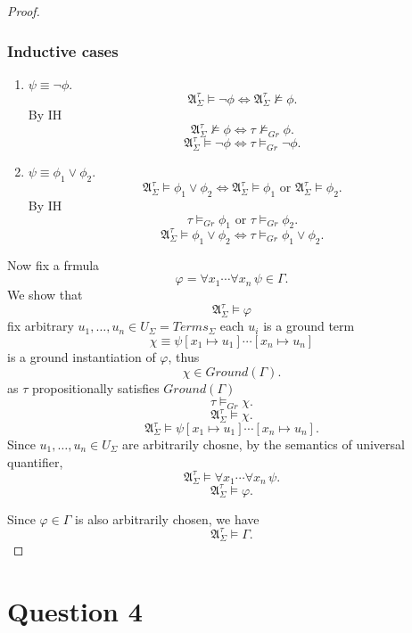 \documentclass{article}
\begin{document}
\begin{proof}
    \subsubsection*{Inductive cases}
    
    \begin{enumerate}
        \item $\psi \equiv \neg \phi$.
        \[
        \mathfrak{A}^\tau_\Sigma \models \neg\phi
        \iff
        \mathfrak{A}^\tau_\Sigma \not\models \phi.
        \]
        By IH
        \[
        \mathfrak{A}^\tau_\Sigma \not\models \phi
        \iff
        \tau \not\models_{Gr} \phi.
        \]
        \[
        \mathfrak{A}^\tau_\Sigma \models \neg\phi
        \iff
        \tau \models_{Gr} \neg\phi.
        \]
    
        \item $\psi \equiv \phi_1\lor\phi_2$.
        \[
        \mathfrak{A}^\tau_\Sigma \models \phi_1\lor\phi_2
        \iff
        \mathfrak{A}^\tau_\Sigma \models \phi_1
        \text{ or }
        \mathfrak{A}^\tau_\Sigma \models \phi_2.
        \]
        By IH
        \[
        \tau \models_{Gr} \phi_1
        \text{ or }
        \tau \models_{Gr} \phi_2.
        \]
        \[
        \mathfrak{A}^\tau_\Sigma \models \phi_1\lor\phi_2
        \iff
        \tau \models_{Gr} \phi_1\lor\phi_2.
        \]
    \end{enumerate}
    Now fix a frmula 
\[
\varphi=\forall x_1\cdots\forall x_n\,\psi \in \Gamma.
\]
We show that
\[
\mathfrak{A}^\tau_\Sigma \models \varphi
\]
fix arbitrary $u_1,\dots,u_n \in U_\Sigma = Terms_\Sigma$
each $u_i$ is a ground term
\[
\chi \equiv \psi[x_1\mapsto u_1]\cdots[x_n\mapsto u_n]
\]
is a ground instantiation of $\varphi$, thus 
\[
\chi \in Ground(\Gamma).
\]
as $\tau$ propositionally satisfies $Ground(\Gamma)$
\[
\tau \models_{Gr} \chi.
\]
\[
\mathfrak{A}^\tau_\Sigma \models \chi.
\]
\[
\mathfrak{A}^\tau_\Sigma \models \psi[x_1\mapsto u_1]\cdots[x_n\mapsto u_n].
\]
Since $u_1,\dots,u_n \in U_\Sigma$ are arbitrarily chosne, by the semantics of universal
quantifier,
\[
\mathfrak{A}^\tau_\Sigma \models \forall x_1\cdots\forall x_n\,\psi.
\]
\[
\mathfrak{A}^\tau_\Sigma \models \varphi.
\]

Since $\varphi \in \Gamma$ is also arbitrarily chosen, we have
\[
\mathfrak{A}^\tau_\Sigma \models \Gamma.
\]
\end{proof}
\bigskip

\section*{Question 4}
\end{document}
